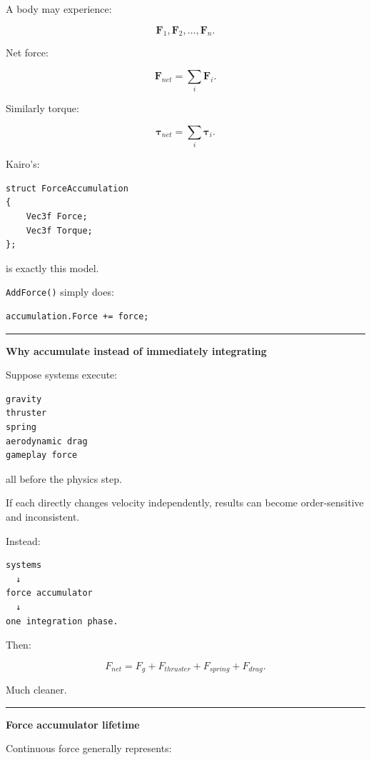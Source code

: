 A body may experience:

\[
\mathbf{F}_1,
\mathbf{F}_2,\dots,\mathbf{F}_n.
\]

Net force:

\[
\boxed{
\mathbf{F}_{net}
=
\sum_i
\mathbf{F}_i.
}
\]

Similarly torque:

\[
\boldsymbol{\tau}_{net}
=
\sum_i
\boldsymbol{\tau}_i.
\]

Kairo's:

\begin{verbatim}
struct ForceAccumulation
{
    Vec3f Force;
    Vec3f Torque;
};
\end{verbatim}

is exactly this model.

\texttt{AddForce()} simply does:

\begin{verbatim}
accumulation.Force += force;
\end{verbatim}

\begin{center}\rule{0.5\linewidth}{0.5pt}\end{center}

\textbf{Why accumulate instead of immediately integrating}

Suppose systems execute:

\begin{verbatim}
gravity
thruster
spring
aerodynamic drag
gameplay force
\end{verbatim}

all before the physics step.

If each directly changes velocity independently, results can become order-sensitive and inconsistent.

Instead:

\begin{verbatim}
systems
  ↓
force accumulator
  ↓
one integration phase.
\end{verbatim}

Then:

\[
F_{net}
=
F_g+
F_{thruster}+
F_{spring}+
F_{drag}.
\]

Much cleaner.

\begin{center}\rule{0.5\linewidth}{0.5pt}\end{center}

\textbf{Force accumulator lifetime}

Continuous force generally represents:

